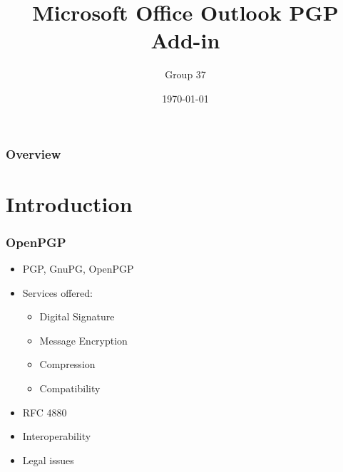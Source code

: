 \documentclass{beamer}
\title[Simple PGP]{Microsoft Office Outlook PGP Add-in} %
\author{Group 37} %
\institute[EMDC] %
{
Instituto Superior Tecnico \\ %
\medskip
}
\date{\today} %
\begin{document}
\begin{frame}
\titlepage %
\end{frame}

\begin{frame}
\frametitle{Overview} %
\tableofcontents %
\end{frame}


\section{Introduction} %

\begin{frame}
\frametitle{OpenPGP}
\begin{itemize}
\item PGP, GnuPG, OpenPGP
\item Services offered: 
\begin{itemize}
\item Digital Signature
\item Message Encryption
\item Compression
\item Compatibility
\end{itemize}
\item RFC 4880
\item Interoperability
\item Legal issues
\end{itemize}
\end{frame}
\end{document}
